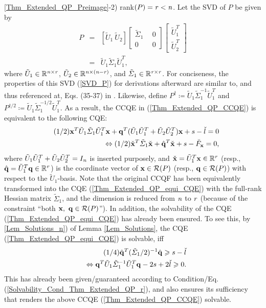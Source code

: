 \documentclass{imaman}
\newcommand{\beq}{\begin{eqnarray}}
\newcommand{\eeq}{\end{eqnarray}}
\newcommand{\bfx}{{\bf x}}
\newcommand{\bfq}{{\bf q}}
\newcommand{\real}{\mathbb{R}}
\newcommand{\calR}{{\mathcal R}}
\newcommand{\itn}{{\it n}}
\newcommand{\itr}{{\it r}}
\numberwithin{equation}{section}
\begin{document}
\noindent\ref{Thm_Extended_QP_Preimage}-2) rank$(P)=\itr<\itn$. Let the SVD of $P$ be given by
\beq
P&=&[\tilde U_1~\tilde U_2]\left[ \begin{array}{cc} \tilde\Sigma_1~~ & 0\\ 0~~ & 0\end{array}\right]\left[ \begin{array}{c} \tilde U_1^T\\\tilde U_2^T\end{array}\right]\nonumber\\
&=&\tilde U_1\tilde\Sigma_1\tilde U_1^T,\label{SVD_P}
\eeq
where $\tilde U_1\in\real^{{\it n}\times {\it r}}$, $\tilde U_2\in\real^{{\it n}\times ({\it n-r})}$, and $\tilde\Sigma_1\in\real^{{\it r}\times {\it r}}$. For conciseness, the properties of this SVD (\ref{SVD_P}) for derivations afterward are similar to, and thus referenced at, Eqs. (35-37) in \cite{LiLiHs:20}. Likewise, define $P^\dagger\coloneqq\tilde U_1\tilde\Sigma_1^{-1}\tilde U_1^T$ and $P^{\dagger/2}\coloneqq\tilde U_1\tilde\Sigma_1^{-1/2}\tilde U_1^T$. As a result, the CCQE in (\ref{Thm_Extended_QP_CCQE}) is equivalent to the following CQE:
\beq
&&(1/2)\bfx^T\tilde U_1\tilde\Sigma_1\tilde U_1^T\bfx+\bfq^T(\tilde U_1\tilde U_1^T+\tilde U_2\tilde U_2^T)\bfx+s-\check l=0\nonumber\\
&&\Leftrightarrow (1/2)\check\bfx^T\tilde\Sigma_1\check\bfx+\hat\bfq^T\check\bfx+s-\breve F_{\bfx}=0,
\label{Thm_Extended_QP_equi_CQE}
\eeq
where $\tilde U_1\tilde U_1^T+\tilde U_2\tilde U_2^T=I_\itn$ is inserted purposely, and $\check\bfx=\tilde U_1^T\bfx\in\real^\itr$ (resp., $\hat\bfq=\tilde U_1^T\bfq\in\real^\itr$) is the coordinate vector of $\bfx\in \calR(P)$ (resp., $\bfq\in \calR(P)$) with respect to the $\tilde U_1$-basis. Note that the original CCQF has been equivalently transformed into the CQE (\ref{Thm_Extended_QP_equi_CQE}) with the full-rank Hessian matrix $\tilde\Sigma_1$, and the dimension is reduced from $\itn$ to $\itr$ (because of the constraint ``both $\bfx,~\bfq\in\calR(P)$''). In addition, the solvability of the CQE (\ref{Thm_Extended_QP_equi_CQE}) has already been ensured. To see this, by \ref{Lem_Solutions_n}) of Lemma \ref{Lem_Solutions}, the CQE (\ref{Thm_Extended_QP_equi_CQE}) is solvable, iff
\beq
&&(1/4)\hat\bfq^T(\tilde\Sigma_1/2)^{-1}\hat\bfq\ge s-\check l\nonumber\\
&&\Leftrightarrow \bfq^T\tilde U_1\tilde\Sigma_1^{-1}\tilde U_1^T\bfq-2s+2\check l\ge 0.\nonumber
\eeq
This has already been given/guaranteed according to Condition/Eq. (\ref{Solvability_Cond_Thm_Extended_QP_r}), and also ensures its sufficiency that renders the above CCQE (\ref{Thm_Extended_QP_CCQE}) solvable.
\end{document}
